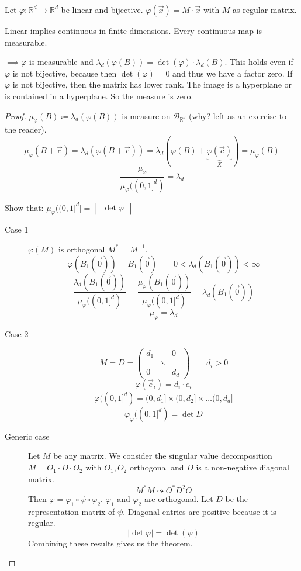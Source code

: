 \documentclass[a4paper]{article}
\numberwithin{lecref}{section}
\theoremstyle{break}
\newcommand{\Abs}[1]{\left|#1\right|}
\def\vec2#1#2{\begin{pmatrix} #1 \\ #2 \end{pmatrix}}
\def\vec3#1#2#3{\begin{pmatrix} #1 \\ #2 \\ #3 \end{pmatrix}}
\begin{document}
\begin{theorem}
  Let $\varphi: \mathbb R^d \to \mathbb R^d$ be linear and bijective.
  $\varphi(\vec x) = M \cdot \vec x$ with $M$ as regular matrix.

  Linear implies continuous in finite dimensions. Every continuous map is measurable.

  $\implies \varphi$ is measurable and $\lambda_d(\varphi(B)) = \det(\varphi) \cdot \lambda_d(B)$.
  This holds even if $\varphi$ is not bijective, because then $\det(\varphi) = 0$ and thus we have a factor zero.
  If $\varphi$ is not bijective, then the matrix has lower rank.
  The image is a hyperplane or is contained in a hyperplane. So the measure is zero.
\end{theorem}

\begin{proof}
  $\mu_{\varphi}(B) \coloneqq \lambda_d(\varphi(B))$ is measure on $\mathcal B_{\mathbb R^d}$ (why? left as an exercise to the reader).
  \[
    \mu_{\varphi}(B + \vec c)
      = \lambda_d(\varphi(B + \vec c)) = \lambda_d(\varphi(B) + \underbrace{\varphi(\vec c)}_{X}) = \mu_{\varphi}(B)
  \] \[ \frac{\mu_{\varphi}}{\mu_{\varphi}((0, 1]^d)} = \lambda_d \]
  
  Show that: $\mu_{\varphi}((0,1]^d] = \begin{vmatrix} \det{\varphi} \end{vmatrix}$

  \begin{description}
    \item[Case 1] $\varphi(M)$ is orthogonal $M^* = M^{-1}$.
      \[ \varphi(B_1(\vec 0)) = B_1(\vec 0) \qquad 0 < \lambda_d(B_1(\vec 0)) < \infty \]
      \[ \frac{\lambda_d(B_1(\vec 0))}{\mu_{\varphi}((0,1]^d)} = \frac{\mu_\varphi(B_1(\vec 0))}{\mu_{\varphi}((0,1]^d)} = \lambda_d(B_1(\vec 0)) \]
      \[ \mu_\varphi = \lambda_d \]
    \item[Case 2] \[ M = D = \begin{pmatrix} d_1 & & 0 \\ & \ddots & \\ 0 & & d_d \end{pmatrix} \qquad d_i > 0 \]
      \[ \varphi(\vec e_i) = d_i \cdot e_i \]
      \[ \varphi((0,1]^d) = (0, d_1] \times (0, d_2] \times \dots (0, d_d] \]
      \[ \varphi_{\varphi}((0,1]^d) = \det{D} \]
    \item[Generic case]
      Let $M$ be any matrix. We consider the singular value decomposition $M = O_1 \cdot D \cdot O_2$
      with $O_1, O_2$ orthogonal and $D$ is a non-negative diagonal matrix.
      \[ M^* M \leadsto O^* D^2 O \]
      Then $\varphi = \varphi_1 \circ \psi \circ \varphi_2$.
      $\varphi_1$ and $\varphi_2$ are orthogonal. Let $D$ be the representation matrix of $\psi$. Diagonal entries are positive because it is regular.
      \[ \Abs{\det\varphi} = \det(\psi) \]
      Combining these results gives us the theorem.
  \end{description}
\end{proof}
\end{document}
